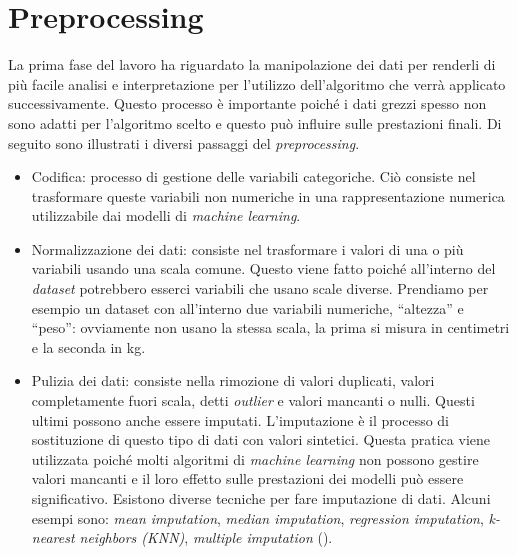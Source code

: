\documentclass[12pt,italian]{report}
\begin{document}
	
	\section{Preprocessing}
	\label{preprocessing}
	La prima fase del lavoro ha riguardato la manipolazione dei dati per renderli di più facile analisi e interpretazione per l'utilizzo dell'algoritmo che verrà applicato successivamente. Questo processo è importante poiché i dati grezzi spesso non sono adatti per l'algoritmo scelto e questo può influire sulle prestazioni finali.
	Di seguito sono illustrati i diversi passaggi del \textit{preprocessing}.
	\begin{itemize}
		\item Codifica: processo di gestione delle variabili categoriche. Ciò consiste nel trasformare queste variabili non numeriche in una rappresentazione numerica utilizzabile dai modelli di \textit{machine learning}. 
		
		\item Normalizzazione dei dati: consiste nel trasformare i valori di una o più variabili usando una scala comune. Questo viene fatto poiché all’interno del \textit{dataset} potrebbero esserci variabili che usano scale diverse. Prendiamo per esempio un dataset con all’interno due variabili numeriche, ``altezza'' e ``peso'': ovviamente non usano la stessa scala, la prima si misura in centimetri e la seconda in kg.
		
		\item Pulizia dei dati: consiste nella rimozione di valori duplicati, valori completamente fuori scala, detti \textit{outlier} e valori mancanti o nulli. Questi ultimi possono anche essere imputati. L'imputazione è il processo di sostituzione di questo tipo di dati con valori sintetici. Questa pratica viene utilizzata poiché molti algoritmi di \textit{machine learning} non possono gestire valori mancanti e il loro effetto sulle prestazioni dei modelli può essere significativo. Esistono diverse tecniche per fare imputazione di dati. Alcuni esempi sono: \textit{mean imputation}, \textit{median imputation}, \textit{regression imputation}, \textit{k-nearest neighbors (KNN)}, \textit{multiple imputation} (\cite{doi:10.1080/08839514.2019.1637138, waljee2013comparison}).
		

\end{itemize}
\end{document}
